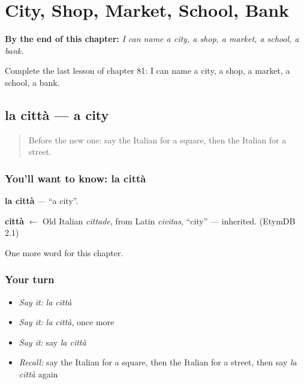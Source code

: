 
\chapter{City, Shop, Market, School, Bank}
\label{ch:it-city-shop-market-school-bank}

\begin{chapteropening}
\textbf{By the end of this chapter:} \emph{I can name a city, a shop, a market, a school, a bank.}

Complete the last lesson of chapter 81: I can name a city, a shop, a market, a school, a bank.
\end{chapteropening}

\section[la città]{la città — a city}

\label{lesson:IT-C81-citta}



\begin{quote}
Before the new one: say the Italian for a square, then the Italian for a street.
\end{quote}

\subsection*{You'll want to know: la città}
\textbf{la città} — \textquotedblleft{}a city\textquotedblright{}.

\begin{cousinweb}
\textbf{città} $\leftarrow$ Old Italian \emph{cittade}, from Latin \emph{civitas}, \textquotedblleft{}city\textquotedblright{} — inherited. (EtymDB 2.1)
\end{cousinweb}

\begin{grammarlens}[title={What you've built}]
One more word for this chapter.
\end{grammarlens}

\subsection*{Your turn}
\begin{itemize}
\raggedright
  \item \emph{Say it:} \emph{la città}
  \item \emph{Say it:} \emph{la città}, once more
  \item \emph{Say it:} say \emph{la città}
  \item \emph{Recall:} say the Italian for a square, then the Italian for a street, then say \emph{la città} again
\end{itemize}

